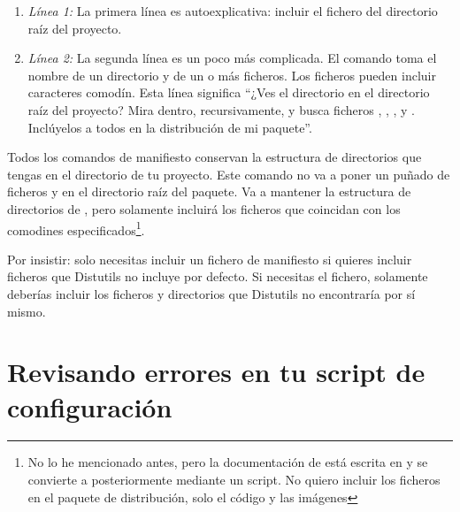 {\begin{enumerate}
  \item \emph{Línea 1:} La primera línea es autoexplicativa: incluir el fichero  del directorio raíz del proyecto.
  \item \emph{Línea 2:} La segunda línea es un poco más complicada. El comando  toma el nombre de un directorio y de un o más ficheros. Los ficheros pueden incluir caracteres comodín. Esta línea significa ``¿Ves el directorio  en el directorio raíz del proyecto? Mira dentro, recursivamente, y busca ficheros , , , y . Inclúyelos a todos en la distribución de mi paquete''.
\end{enumerate}

Todos los comandos de manifiesto conservan la estructura de directorios que tengas en el directorio de tu proyecto. Este comando  no va a poner un puñado de ficheros  y  en el directorio raíz del paquete. Va a mantener la estructura de directorios de , pero solamente incluirá los ficheros que coincidan con los comodines especificados\footnote{No lo he mencionado antes, pero la documentación de  está escrita en  y se convierte a  posteriormente mediante un script. No quiero incluir los ficheros  en el paquete de distribución, solo el código  y las imágenes}.


Por insistir: solo necesitas incluir un fichero de manifiesto si quieres incluir ficheros que Distutils no incluye por defecto. Si necesitas el fichero, solamente deberías incluir los ficheros y directorios que Distutils no encontraría por sí mismo.

\section{Revisando errores en tu script de configuración}

}
